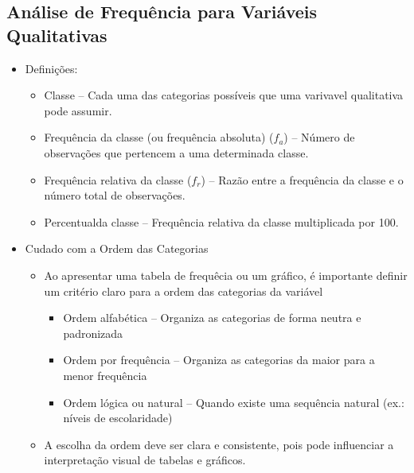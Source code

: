 \documentclass[12pt]{article}
\begin{document}
    \subsection{Análise de Frequência para Variáveis Qualitativas}
    \begin{itemize}
        \item Definições:
        \begin{itemize}
            \item Classe -- Cada uma das categorias possíveis que uma varivavel 
            qualitativa pode assumir.
            \item Frequência da classe (ou frequência absoluta) ($f_a$) -- Número 
            de observações que pertencem a uma determinada classe.
            \item Frequência relativa da classe ($f_r$) -- Razão entre a 
            frequência da classe e o número total de observações.
            \item Percentualda classe -- Frequência relativa da classe 
            multiplicada por 100.
        \end{itemize}
        \item Cudado com a Ordem das Categorias
        \begin{itemize}
            \item Ao apresentar uma tabela de frequêcia ou um gráfico, é 
            importante definir um critério claro para a ordem das categorias da 
            variável
            \begin{itemize}
                \item Ordem alfabética -- Organiza as categorias de forma neutra 
                e padronizada
                \item Ordem por frequência -- Organiza as categorias da maior 
                para a menor frequência
                \item Ordem lógica ou natural -- Quando existe uma sequência 
                natural (ex.: níveis de escolaridade)
            \end{itemize}
            \item A escolha da ordem deve ser clara e consistente, pois pode 
            influenciar a interpretação visual de tabelas e gráficos.
        \end{itemize}
    \end{itemize}
\end{document}
